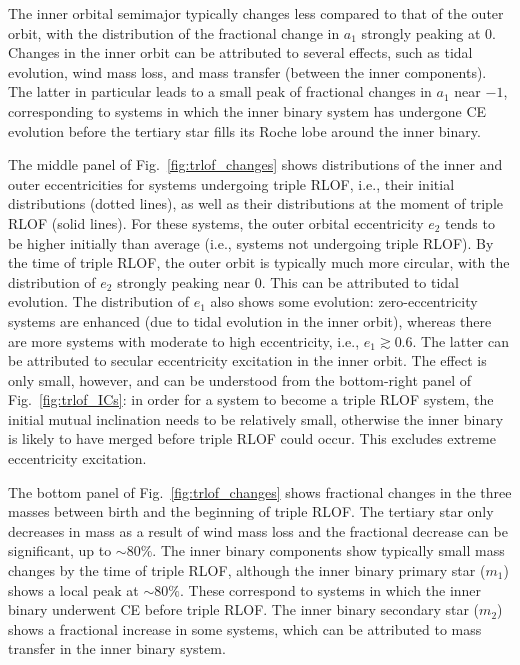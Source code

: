 \documentclass[twocolumn,appendixfloats,tighten]{aastex631}
\newcommand{\F}{Fig.}
\begin{document}
The inner orbital semimajor typically changes less compared to that of the outer orbit, with the distribution of the fractional change in $a_1$ strongly peaking at 0. Changes in the inner orbit can be attributed to several effects, such as tidal evolution, wind mass loss, and mass transfer (between the inner components). The latter in particular leads to a small peak of fractional changes in $a_1$ near $-1$, corresponding to systems in which the inner binary system has undergone CE evolution before the tertiary star fills its Roche lobe around the inner binary. 

The middle panel of \F~\ref{fig:trlof_changes} shows distributions of the inner and outer eccentricities for systems undergoing triple RLOF, i.e., their initial distributions (dotted lines), as well as their distributions at the moment of triple RLOF (solid lines). For these systems, the outer orbital eccentricity $e_2$ tends to be higher initially than average (i.e., systems not undergoing triple RLOF). By the time of triple RLOF, the outer orbit is typically much more circular, with the distribution of $e_2$ strongly peaking near 0. This can be attributed to tidal evolution. The distribution of $e_1$ also shows some evolution: zero-eccentricity systems are enhanced (due to tidal evolution in the inner orbit), whereas there are more systems with moderate to high eccentricity, i.e., $e_1\gtrsim 0.6$. The latter can be attributed to secular eccentricity excitation in the inner orbit. The effect is only small, however, and can be understood from the bottom-right panel of \F~\ref{fig:trlof_ICs}: in order for a system to become a triple RLOF system, the initial mutual inclination needs to be relatively small, otherwise the inner binary is likely to have merged before triple RLOF could occur. This excludes extreme eccentricity excitation.

The bottom panel of \F~\ref{fig:trlof_changes} shows fractional changes in the three masses between birth and the beginning of triple RLOF. The tertiary star only decreases in mass as a result of wind mass loss and the fractional decrease can be significant, up to $\sim 80\%$. The inner binary components show typically small mass changes by the time of triple RLOF, although the inner binary primary star ($m_1$) shows a local peak at $\sim 80\%$. These correspond to systems in which the inner binary underwent CE before triple RLOF. The inner binary secondary star ($m_2$) shows a fractional increase in some systems, which can be attributed to mass transfer in the inner binary system.
\end{document}
